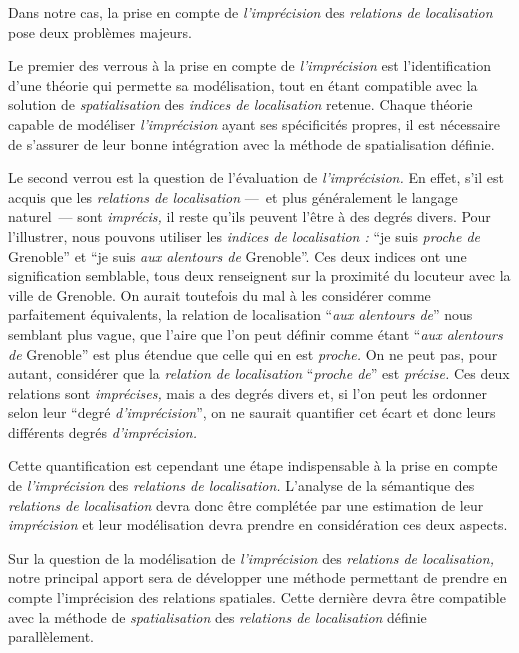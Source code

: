Dans notre cas, la prise en compte de \emph{l'imprécision} des
\emph{relations de localisation} pose deux problèmes majeurs.

Le premier des verrous à la prise en compte de \emph{l'imprécision}
est l'identification d'une théorie qui permette sa modélisation, tout
en étant compatible avec la solution de \emph{spatialisation} des
\emph{indices de localisation} retenue. Chaque théorie capable de
modéliser \emph{l'imprécision} ayant ses spécificités propres, il est
nécessaire de s'assurer de leur bonne intégration avec la méthode de
spatialisation définie.

Le second verrou est la question de l'évaluation de
\emph{l'imprécision.} En effet, s'il est acquis que les
\emph{relations de localisation} ---~et plus généralement le langage
naturel~--- sont \emph{imprécis,} il reste qu'ils peuvent l'être à des
degrés divers. Pour l'illustrer, nous pouvons utiliser les
\emph{indices de localisation :} \enquote{je suis \emph{proche de}
  Grenoble} et \enquote{je suis \emph{aux alentours de} Grenoble}. Ces
deux indices ont une signification semblable, tous deux renseignent
sur la proximité du locuteur avec la ville de Grenoble. On aurait
toutefois du mal à les considérer comme parfaitement équivalents, la
relation de localisation \enquote{\emph{aux alentours de}} nous
semblant plus vague, \ie que l'aire que l'on peut définir comme étant
\enquote{\emph{aux alentours de} Grenoble} est plus étendue que celle
qui en est \emph{proche.} On ne peut pas, pour autant, considérer que
la \emph{relation de localisation} \enquote{\emph{proche de}} est
\emph{précise.} Ces deux relations sont \emph{imprécises,} mais a des
degrés divers et, si l'on peut les ordonner selon leur \enquote{degré
  \emph{d'imprécision}}, on ne saurait quantifier cet écart et donc
leurs différents degrés \emph{d'imprécision.}

Cette quantification est cependant une étape indispensable à la prise
en compte de \emph{l'imprécision} des \emph{relations de
  localisation.} L'analyse de la sémantique des \emph{relations de
  localisation} devra donc être complétée par une estimation de leur
\emph{imprécision} et leur modélisation devra prendre en considération
ces deux aspects.

Sur la question de la modélisation de \emph{l'imprécision} des
\emph{relations de localisation,} notre principal apport sera de
développer une méthode permettant de prendre en compte l'imprécision
des relations spatiales. Cette dernière devra être compatible avec la
méthode de \emph{spatialisation} des \emph{relations de localisation}
définie parallèlement.

